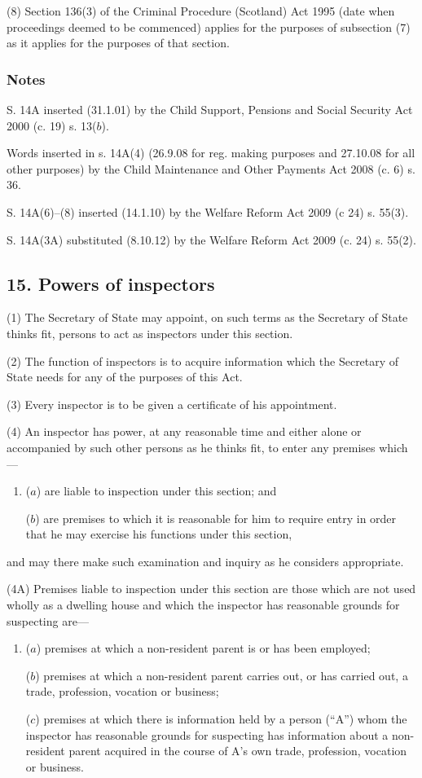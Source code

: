 \documentclass[a4paper]{article}
\newcommand\amendment[1]{\subsubsection*{Notes}{\itshape\frenchspacing\footnotesize #1 \par}}
\begin{document}
(8)
Section 136(3) of the Criminal Procedure (Scotland) Act 1995 (date
when proceedings deemed to be commenced) applies for the purposes of subsection
(7) as it applies for the purposes of that section.

\amendment{

S. 14A inserted (31.1.01) by the Child Support, Pensions and Social Security Act
2000 (c. 19) s. 13($b$).

Words inserted in s. 14A(4) (26.9.08 for reg.
making purposes and 27.10.08 for all other
purposes) by the Child Maintenance and Other Payments Act 2008 (c. 6) s. 36.

S. 14A(6)--(8) inserted (14.1.10) by the Welfare Reform Act 2009 (c 24) s. 55(3).

S. 14A(3A) substituted (8.10.12) by the Welfare Reform Act 2009 (c. 24) s. 55(2). 


}

\subsection{15. Powers of inspectors}

(1) The Secretary of State may appoint, on such terms as the Secretary of State thinks fit, persons to act as inspectors under this section.

(2)
The function of inspectors is to acquire information which the Secretary of State needs for any of the purposes of this Act.

(3)
Every inspector is to be given a certificate of his appointment.

(4)
An inspector has power, at any reasonable time and either alone or accompanied by such other persons as he thinks fit, to enter any premises which---
\begin{enumerate}\item[]
($a$) are liable to inspection under this section; and

($b$) are premises to which it is reasonable for him to require entry in order that he may exercise his functions under this section,
\end{enumerate}
and may there make such examination and inquiry as he considers appropriate.

(4A) Premises liable to inspection under this section are those which are not used wholly as a dwelling house and which the inspector has reasonable grounds for suspecting are---
\begin{enumerate}\item[]
($a$) premises at which a non-resident parent is or has been employed;

($b$) premises at which a non-resident parent carries out, or has carried out, a trade, profession, vocation or business;

($c$) premises at which there is information held by a person (“A”) whom the inspector has reasonable grounds for suspecting has information about a non-resident parent acquired in the course of A’s own trade, profession, vocation or business.
\end{enumerate}
\end{document}
